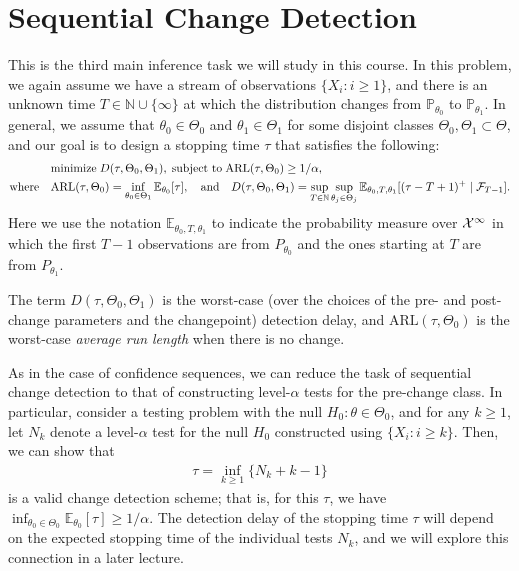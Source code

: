 \documentclass[12pt]{article}
\begin{document}
\section{Sequential Change Detection}

This is the third main inference task we will study in this course. In this problem, we again assume we have a stream of observations $\{X_i: i \geq 1\}$, and there is an unknown time $T \in \mathbb{N} \cup \{\infty\}$ at which the distribution changes from $\mathbb{P}_{\theta_0}$ to $\mathbb{P}_{\theta_1}$. In general, we assume that $\theta_0 \in \Theta_0$ and $\theta_1 \in \Theta_1$ for some disjoint classes $\Theta_0, \Theta_1 \subset \Theta$, and our goal is to design a stopping time $\tau$ that satisfies the following: 
\begin{align}
    &\mathrm{minimize} \; D(\tau, \Theta_0, \Theta_1), \; \text{subject to} \; \mathrm{ARL}(\tau, \Theta_0) \geq 1/\alpha, \\
    \text{where} \quad 
    &\mathrm{ARL}(\tau, \Theta_0) = \inf_{\theta_0 \in \Theta_1} \mathbb{E}_{\theta_0}[\tau], \quad \text{and} \quad D(\tau, \Theta_0, \Theta_1) = \sup_{T \in \mathbb{N}}  \sup_{\theta_j \in \Theta_j} \mathbb{E}_{\theta_0, T, \theta_1}[(\tau - T+1)^+ \mid {\cal F}_{T-1}]. 
\end{align}
Here we use the notation $\mathbb{E}_{\theta_0, T, \theta_1}$ to indicate the probability measure over ${\cal X}^\infty$  in which the first $T-1$ observations are from $P_{\theta_0}$ and the ones starting at $T$ are from $P_{\theta_1}$. 

The term $D(\tau,  \Theta_0, \Theta_1)$ is the worst-case (over the choices of the pre- and post-change parameters and the changepoint) detection delay, and $\mathrm{ARL}(\tau, \Theta_0)$  is the worst-case \emph{average run length} when there is no change. 

As in the case of confidence sequences, we can reduce the task of sequential change detection to that of constructing level-$\alpha$ tests for the pre-change class. In particular, consider a testing problem with the null $H_0: \theta \in \Theta_0$, and for any $k \geq 1$, let $N_k$ denote a level-$\alpha$ test for the null $H_0$ constructed using $\{X_i: i \geq k\}$. Then, we can show that 
\begin{align}
    \tau = \inf_{k \geq 1} \{N_k + k -1 \}
\end{align}
is a valid change detection scheme; that is, for this $\tau$, we have $\inf_{\theta_0 \in \Theta_0} \mathbb{E}_{\theta_0}[\tau] \geq 1/\alpha$. The detection delay of the stopping time $\tau$ will depend on the expected stopping time of the individual tests $N_k$, and we will explore this connection in a later lecture. 
\end{document}
